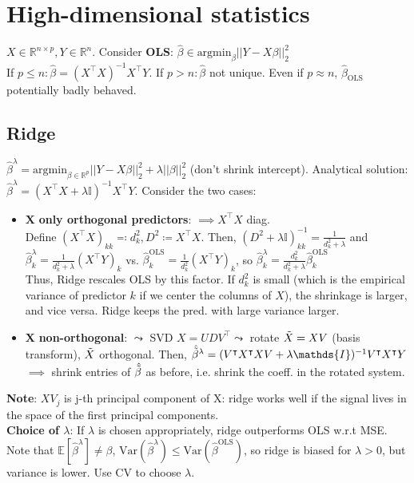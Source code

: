 \section{High-dimensional statistics}
$X \in \mathbb{R}^{n \times p}, Y \in \mathbb{R}^n$. Consider \textbf{OLS}: $\hat{\beta} \in \text{argmin}_\beta ||Y-X\beta||_2^2$ \\ 
If $p \leq n: \hat{\beta} = (X^\intercal X)^{-1}X^\intercal Y$. If $p > n: \hat{\beta}$ not unique. Even if  $p \approx n$, $\hat{\beta}_{\text{OLS}}$ potentially badly behaved. 
\subsection*{Ridge} 
$\hat{\beta}^\lambda = \text{argmin}_{\beta \in \mathbb{R}^p} ||Y-X\beta||_2^2 + \lambda||\beta||_2^2$ (don't shrink intercept). Analytical solution: $\hat{\beta}^\lambda = (X^\intercal X + \lambda \mathds{I})^{-1}X^\intercal Y$. Consider the two cases:\\
\begin{itemize}
    \item $\mathbf{X}$ \textbf{only orthogonal predictors}: $\implies X^\intercal X$ diag. \\ Define $(X^\intercal X)_{kk} \eqqcolon d^2_k, D^2 \coloneqq X^\intercal X$. Then, $(D^2+\lambda\mathbb{I})^{-1}_{kk}=\frac{1}{d^2_k+\lambda}$ and \\ $\hat{\beta}^\lambda_k=\frac{1}{d^2_k + \lambda}(X^\intercal Y)_k$ vs. $\hat{\beta}^{\text{OLS}}_k = \frac{1}{d^2_k} (X^\intercal Y)_k$, so $\hat{\beta}_k^\lambda = \frac{d^2_k}{d^2_k + \lambda} \hat{\beta}_k^{\text{OLS}}$ \\ Thus, Ridge rescales OLS by this factor. If $d^2_k$ is small (which is the empirical variance of predictor $k$ if we center the columns of $X$), the shrinkage is larger, and vice versa. Ridge keeps the pred.  with large variance larger. 
    \item $\mathbf{X}$ \textbf{non-orthogonal}: $\leadsto$ SVD $ X = UDV^\intercal \leadsto$ rotate $\Tilde{X} = XV$ (basis transform), $\Tilde{X}$ orthogonal. Then, $\hat{\Tilde{\beta}}^\lambda = (V^\intercal X^\intercal XV + \lambda \mathds{I})^{-1}V^\intercal X^\intercal Y$ $\implies$ shrink entries of $\hat{\Tilde{\beta}}$ as before, i.e. shrink the coeff. in the rotated system.
\end{itemize}
\textbf{Note}: $XV_j$ is j-th principal component of X: ridge works well if the signal lives in the space of the first principal components. \\
\textbf{Choice of $\lambda$}: If $\lambda$ is chosen appropriately, ridge outperforms OLS w.r.t MSE. Note that $\mathbb{E}[\hat{\beta}^\lambda] \neq \beta$, $\text{Var}(\hat{\beta}^\lambda) \leq \text{Var}(\hat{\beta}^{\text{OLS}})$, so ridge is biased for $\lambda > 0$, but variance is lower. Use CV to choose $\lambda$.

